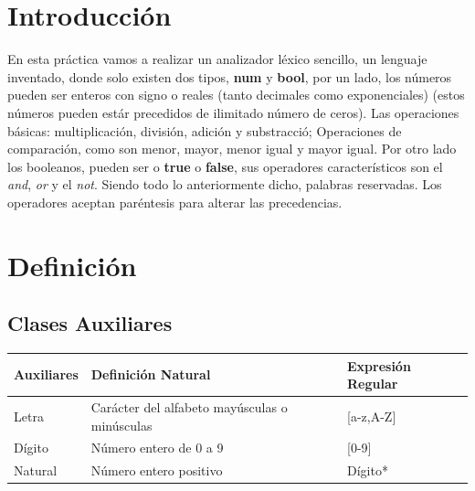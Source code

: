 \documentclass{article}
\begin{document}
\section{Introducción}
En esta práctica vamos a realizar un analizador léxico sencillo, un lenguaje inventado, donde solo existen dos tipos, \textbf{num} y \textbf{bool}, por un lado, los números pueden ser enteros con signo o reales (tanto decimales como exponenciales) (estos números pueden estár precedidos de ilimitado número de ceros). Las operaciones básicas: multiplicación, división, adición y substracció; Operaciones de comparación, como son menor, mayor, menor igual y mayor igual. Por otro lado los booleanos, pueden ser o \textbf{true} o \textbf{false}, sus operadores característicos son el \textit{and}, \textit{or} y el \textit{not}. Siendo todo lo anteriormente dicho, palabras reservadas. Los operadores aceptan paréntesis para alterar las precedencias.

\newpage

\section{Definición}
\subsection{Clases Auxiliares}
\begin{center}
    \begin{tabular}{ | p{2cm} | p{5cm} | p{4cm} |}
    \hline
    Auxiliares & Definición Natural & Expresión Regular \\ \hline
    Letra & Carácter del alfabeto mayúsculas o minúsculas  & [a-z,A-Z]\\ \hline
    Dígito & Número entero de 0 a 9 & [0-9] \\ \hline
    Natural & Número entero positivo & Dígito* \\ \hline
    \end{tabular}
\end{center}
\end{document}
